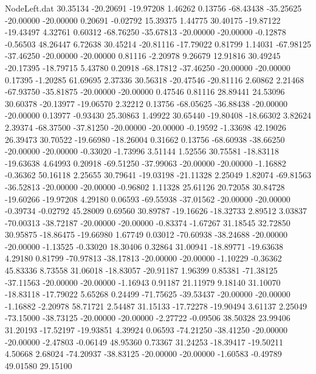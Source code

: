 \begin{filecontents}{NodeLeft.dat}
  30.35134  -20.20691  -19.97208     1.46262    0.13756  -68.43438  -35.25625  -20.00000  -20.00000    0.20691   -0.02792   15.39375    1.44775
  30.40175  -19.87122  -19.43497     4.32761    0.60312  -68.76250  -35.67813  -20.00000  -20.00000   -0.12878   -0.56503   48.26447    6.72638
  30.45214  -20.81116  -17.79022     0.81799    1.14031  -67.98125  -37.46250  -20.00000  -20.00000    0.81116   -2.20978    9.26679   12.91816
  30.49245  -20.17395  -18.79715     5.43780    0.20918  -68.17812  -37.46250  -20.00000  -20.00000    0.17395   -1.20285   61.69695    2.37336
  30.56318  -20.47546  -20.81116     2.60862    2.21468  -67.93750  -35.81875  -20.00000  -20.00000    0.47546    0.81116   28.89441   24.53096
  30.60378  -20.13977  -19.06570     2.32212    0.13756  -68.05625  -36.88438  -20.00000  -20.00000    0.13977   -0.93430   25.30863    1.49922
  30.65440  -19.80408  -18.66302     3.82624    2.39374  -68.37500  -37.81250  -20.00000  -20.00000   -0.19592   -1.33698   42.19026   26.39473
  30.70522  -19.66980  -18.26004     0.31662    0.13756  -68.60938  -38.66250  -20.00000  -20.00000   -0.33020   -1.73996    3.51144    1.52556
  30.75581  -18.83118  -19.63638     4.64993    0.20918  -69.51250  -37.99063  -20.00000  -20.00000   -1.16882   -0.36362   50.16118    2.25655
  30.79641  -19.03198  -21.11328     2.25049    1.82074  -69.81563  -36.52813  -20.00000  -20.00000   -0.96802    1.11328   25.61126   20.72058
  30.84728  -19.60266  -19.97208     4.29180    0.06593  -69.55938  -37.01562  -20.00000  -20.00000   -0.39734   -0.02792   45.28009    0.69560
  30.89787  -19.16626  -18.32733     2.89512    3.03837  -70.00313  -38.72187  -20.00000  -20.00000   -0.83374   -1.67267   31.18545   32.72850
  30.95875  -18.86475  -19.66980     1.67749    0.03012  -70.60938  -38.24688  -20.00000  -20.00000   -1.13525   -0.33020   18.30406    0.32864
  31.00941  -18.89771  -19.63638     4.29180    0.81799  -70.97813  -38.17813  -20.00000  -20.00000   -1.10229   -0.36362   45.83336    8.73558
  31.06018  -18.83057  -20.91187     1.96399    0.85381  -71.38125  -37.11563  -20.00000  -20.00000   -1.16943    0.91187   21.11979    9.18140
  31.10070  -18.83118  -17.79022     5.65268    0.24499  -71.75625  -39.53437  -20.00000  -20.00000   -1.16882   -2.20978   58.71721    2.54487
  31.15133  -17.72278  -19.90494     3.61137    2.25049  -73.15000  -38.73125  -20.00000  -20.00000   -2.27722   -0.09506   38.50328   23.99406
  31.20193  -17.52197  -19.93851     4.39924    0.06593  -74.21250  -38.41250  -20.00000  -20.00000   -2.47803   -0.06149   48.95360    0.73367
  31.24253  -18.39417  -19.50211     4.50668    2.68024  -74.20937  -38.83125  -20.00000  -20.00000   -1.60583   -0.49789   49.01580   29.15100

\end{filecontents}
